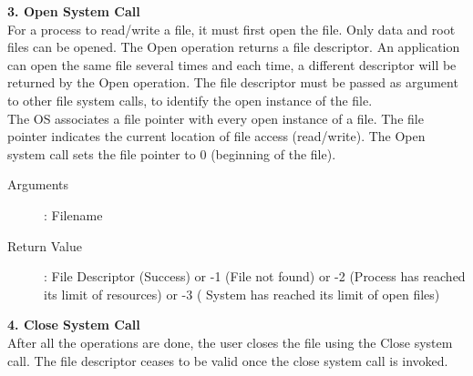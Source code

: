 \documentclass[11pt ,twosided]{article}
\begin{document}
\fi
\textbf{3. Open System Call}
\vspace{3mm}\\
For a process to read/write a file, it must first open the file. Only data and root files can be opened. The Open operation returns a file descriptor. An application can open the same file several times and each time, a different descriptor will be returned by the Open operation. The file descriptor must be passed as argument to other file system calls, to identify the open instance of the file.
\vspace{2mm}\\
The OS associates a file pointer with every open instance of a file. The file pointer indicates the current location of file access (read/write). The Open system call sets the file pointer to 0 (beginning of the file).
\vspace{2mm}
\begin{description}
	\item[Arguments]: Filename
	\item[Return Value]: File Descriptor (Success) or -1 (File not found) or -2 (Process has reached its limit of resources) or -3 ( 	System has reached its limit of open files)
\end{description} 

\textbf{4. Close System Call}
\vspace{2mm}\\
 After all the operations are done, the user closes the file using the Close system call. The file descriptor ceases to be valid once the close system call is invoked. 
\end{document}
